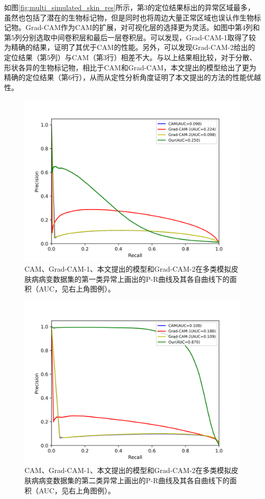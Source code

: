 如图\ref{fig:multi_simulated_skin_res}所示，第$3$的定位结果标出的异常区域最多，虽然也包括了潜在的生物标记物，但是同时也将周边大量正常区域也误认作生物标记物。Grad-CAM作为CAM的扩展，对可视化层的选择更为灵活。如图中第$4$列和第$5$列分别选取中间卷积层和最后一层卷积层。可以发现，Grad-CAM-1取得了较为精确的结果，证明了其优于CAM的性能。另外，可以发现Grad-CAM-2给出的定位结果（第$5$列）与CAM（第$3$行）相差不大。与以上结果相比较，对于分散、形状各异的生物标记物，相比于CAM和Grad-CAM，本文提出的模型给出了更为精确的定位结果（第$6$行），从而从定性分析角度证明了本文提出的方法的性能优越性。

\begin{figure}[!htbp]
	\centering
	\includegraphics[width=1.0\textwidth]{figure/pr_curve_multi_skin/IMAGE_NET_pr_curve.png}
	\caption{CAM、Grad-CAM-1、本文提出的模型和Grad-CAM-2在多类模拟皮肤病病变数据集的第一类异常上画出的P-R曲线及其各自曲线下的面积（AUC，见右上角图例）。} 
	\label{fig:multi_simulate_pr_curve_image_net}
\end{figure}

\begin{figure}[!htbp]
	\centering
	\includegraphics[width=1.0\textwidth]{figure/pr_curve_multi_skin/SKIN_pr_curve.png}
	\caption{CAM、Grad-CAM-1、本文提出的模型和Grad-CAM-2在多类模拟皮肤病病变数据集的第二类异常上画出的P-R曲线及其各自曲线下的面积（AUC，见右上角图例）。} 
	\label{fig:multi_simulate_pr_curve_skin}
\end{figure}

